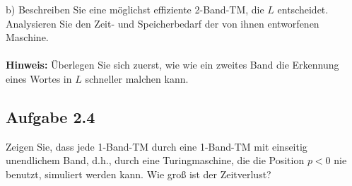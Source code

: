 b) Beschreiben Sie eine möglichst effiziente 2-Band-TM, die $L$ entscheidet. Analysieren Sie den Zeit- und Speicherbedarf der von ihnen entworfenen Maschine.\\\\

\textbf{Hinweis:} Überlegen Sie sich zuerst, wie wie ein zweites Band die Erkennung eines Wortes in $L$ schneller malchen kann.

\subsection*{Aufgabe 2.4}
Zeigen Sie, dass jede 1-Band-TM durch eine 1-Band-TM mit einseitig unendlichem Band, d.h., durch eine Turingmaschine, die die Position $p < 0$ nie benutzt, simuliert werden kann. Wie groß ist der Zeitverlust?